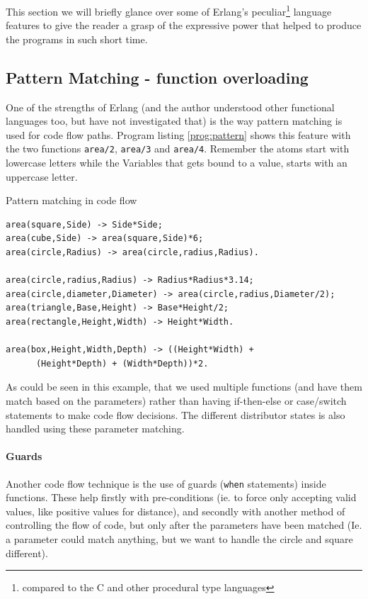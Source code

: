 \documentclass[a4paper,11pt]{report}
\begin{document}
This section we will briefly glance over some of Erlang's
peculiar\footnote{compared to the C and other procedural type
  languages} language features to give the reader a grasp of the
expressive power that helped to produce the programs in such short
time.

\subsection{Pattern Matching - function overloading}
\label{sec:pattern}

One of the strengths of Erlang (and the author understood other
functional languages too, but have not investigated that) is the way
pattern matching is used for code flow paths. Program listing
\autoref{prog:pattern} shows this feature with the two functions
\texttt{area/2}, \texttt{area/3} and \texttt{area/4}. Remember the
atoms start with lowercase letters while the Variables that gets bound
to a value, starts with an uppercase letter.

\begin{Program}
\caption{Pattern matching in code flow}
\label{prog:pattern}
\begin{lstlisting}
area(square,Side) -> Side*Side;
area(cube,Side) -> area(square,Side)*6;
area(circle,Radius) -> area(circle,radius,Radius).

area(circle,radius,Radius) -> Radius*Radius*3.14;
area(circle,diameter,Diameter) -> area(circle,radius,Diameter/2);
area(triangle,Base,Height) -> Base*Height/2;
area(rectangle,Height,Width) -> Height*Width.

area(box,Height,Width,Depth) -> ((Height*Width) +
      (Height*Depth) + (Width*Depth))*2.
\end{lstlisting}
\end{Program}

As could be seen in this example, that we used multiple functions (and
have them match based on the parameters) rather than having
if-then-else or case/switch statements to make code flow
decisions. The different distributor states is also handled using
these parameter matching.

\paragraph{Guards} 
\label{par:guards}Another code flow technique is the use of guards
(\texttt{when} statements) inside functions. These help firstly with
pre-conditions (ie. to force only accepting valid values, like
positive values for distance), and secondly with another method of
controlling the flow of code, but only after the parameters have been
matched (Ie. a parameter could match anything, but we want to handle
the circle and square different).
\end{document}
